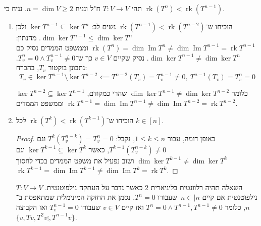 \documentclass[]{article}
\DeclareMathOperator\Img   {Im}
\DeclareMathOperator{\rk}     {rk}
\newcommand\co        {\colon}
\begin{document}
	\section{}
	תהי $T \co V \to V$ ח"ל ונניח $n = \dim V \ge 2$. נניח כי $\rk(T^n) < \rk(T^{n - 1})$. 
	\begin{enumerate}
		\item הוכיחו ש־$\rk(T^{n - 1}) < \rk(T^{n - 2})$
		נשים לב: $\ker T^{n - 1} \subseteq \ker T^n$ ולכן $\dim \ker T^{n - 1} \le \dim \ker T^{n}$. מהנתון: $\rk(T^n) = \dim \Img T^n \neq \dim \Img T^{n - 1} = \rk T^{n - 1}$ וממשפט הממדים נסיק כם $\dim \ker T^{n - 1} \neq \dim \ker T^{n}$. נסיק שקיים $v \in V$ כך ש־$T^{n}_v = 0 \land T^{n - 1}_{v} \neq 0$. נתבונן בוקטור $T_v$, בהכרח: 
		\[ T_v \in \ker T^{n - 1} \setminus \ker T^{n - 2} \impliedby T^{n - 2}(T_v) = T_v^{n - 1} \neq 0, \ T^{n - 1}(T_v) = T^n_v = 0 \]
		
		כלומר $\dim \ker T^{n - 1} \neq \dim \ker T^{n - 2}$ שהרי כמקודם, $\ker T^{n -2 } \subseteq \ker T^{n - 1}$ וממשפט הממדים $\rk T^{n - 1} = \dim \Img T^{n - 1} \neq \dim \Img T^{n - 2}= \rk T^{n - 2}$. 
		
		\item הוכיחו ש־$\rk(T^{k}) < \rk(T^{k - 1})$ לכל $k \in [n]$. 
		\begin{proof}
			באופן דומה, עבור $1 \le k \le n$, נקבל: $T^k(T^{n - k}_v) = T^{n}_v = 0$ וגם $T^{k - 1}(T^{n - k}_v) \neq 0$, כאשר $\ker T^{k - 1} \subseteq \ker T^{k}$ וגם $\dim \ker T^{k - 1} \neq \dim \ker T^k$ ושוב נפעיל את משפט הממדים בכדי לחסוך $\rk T^{k - 1} = \dim \Img T^{k - 1} \neq \dim \Img T^{k} = \rk T^{k}$. 
		\end{proof}
		
		השאלה תהיה רלוונטית בליניארית 2 כאשר נדבר על העתקה נילפוטנטית. $T \co V \to V$ נילפוטנטית אם קיים $n \in |n $\ שעבורו $T^n = 0$. נסמן את החזקה המינימלית שמתאפסת ב־$n$, כלומר $T^n = 0 \land T^{n - 1}, T^{n - 1} \neq 0$ ואז קיים $v \in V$ שעבורו $T^{n - 1}_v = 0$ ואז הקבוצה $\{v, Tv, T^{2}v \vdots, T^{n - 1}v\}$. 
	\end{enumerate}
	
\end{document}
